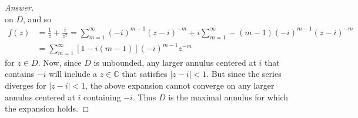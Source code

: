 \documentclass[12pt]{article}
\newcommand{\cx}{\mathbb{C}}
\newcommand\paren[1]{\left( #1 \right)}
\newcommand{\sqbrack}[1]{\left [ #1 \right ]}
\newcommand{\abs}[1]{\left| #1 \right|}
\theoremstyle{definition}
\begin{document}
\begin{proof}[Answer]
\[    \]
    on $D$, and so 
    \begin{align*}
        f(z) & = \frac{1}{z} + \frac{i}{z^2} = \sum\limits_{m = 1}^{\infty} (-i)^{m-1} (z - i)^{-m} + i \sum\limits_{m = 1}^{\infty} -(m-1) (-i)^{m-1} \paren{ z - i }^{-m} \\ 
        & = \sum\limits_{m = 1}^{\infty} \sqbrack{ 1 - i(m-1) } (-i)^{m-1} z^{-m} 
    \end{align*}
    for $z \in D$. Now, since $D$ is unbounded, any larger annulus centered at $i$ that contains $-i$ will include a $z \in \cx$ that satisfies $\abs{z - i} < 1$. But since the series diverges for $\abs{ z - i } < 1$, the above expansion cannot converge on any larger annulus centered at $i$ containing $-i$. Thus $D$ is the maximal annulus for which the expansion holds. 
\end{proof}
\end{document}
